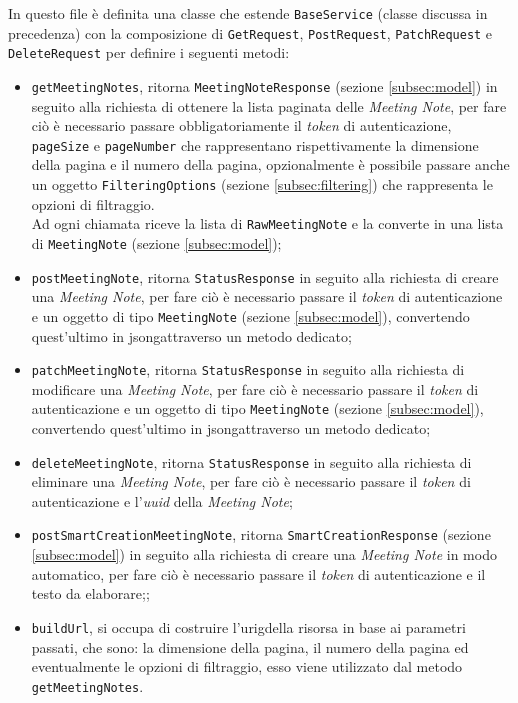 In questo file è definita una classe che estende \lstinline{BaseService} (classe discussa in precedenza) con la composizione di \lstinline{GetRequest}, \lstinline{PostRequest}, \lstinline{PatchRequest} e \lstinline{DeleteRequest} per definire i seguenti metodi:
\begin{itemize}
    \item \lstinline{getMeetingNotes}, ritorna \lstinline{MeetingNoteResponse} (sezione \ref{subsec:model}) in seguito alla richiesta di ottenere la lista paginata delle \emph{Meeting Note}, per fare ciò è necessario passare obbligatoriamente il \emph{token} di autenticazione, \lstinline{pageSize} e \lstinline{pageNumber} che rappresentano rispettivamente la dimensione della pagina e il numero della pagina, opzionalmente è possibile passare anche un oggetto \lstinline{FilteringOptions} (sezione \ref{subsec:filtering}) che rappresenta le opzioni di filtraggio. \\
    Ad ogni chiamata riceve la lista di \lstinline{RawMeetingNote} e la converte in una lista di \lstinline{MeetingNote} (sezione \ref{subsec:model});
    \item \lstinline{postMeetingNote}, ritorna \lstinline{StatusResponse} in seguito alla richiesta di creare una \emph{Meeting Note}, per fare ciò è necessario passare il \emph{token} di autenticazione e un oggetto di tipo \lstinline{MeetingNote} (sezione \ref{subsec:model}), convertendo quest'ultimo in \gls{jsong}\glsoccur attraverso un metodo dedicato;
    \item \lstinline{patchMeetingNote}, ritorna \lstinline{StatusResponse} in seguito alla richiesta di modificare una \emph{Meeting Note}, per fare ciò è necessario passare il \emph{token} di autenticazione e un oggetto di tipo \lstinline{MeetingNote} (sezione \ref{subsec:model}), convertendo quest'ultimo in \gls{jsong}\glsoccur attraverso un metodo dedicato;
    \item \lstinline{deleteMeetingNote}, ritorna \lstinline{StatusResponse} in seguito alla richiesta di eliminare una \emph{Meeting Note}, per fare ciò è necessario passare il \emph{token} di autenticazione e l'\emph{uuid} della \emph{Meeting Note};
    \item \lstinline{postSmartCreationMeetingNote}, ritorna \lstinline{SmartCreationResponse} (sezione \ref{subsec:model}) in seguito alla richiesta di creare una \emph{Meeting Note} in modo automatico, per fare ciò è necessario passare il \emph{token} di autenticazione e il testo da elaborare;;
    \item \lstinline{buildUrl}, si occupa di costruire l'\gls{urig}\glsoccur della risorsa in base ai parametri passati, che sono: la dimensione della pagina, il numero della pagina ed eventualmente le opzioni di filtraggio, esso viene utilizzato dal metodo \lstinline{getMeetingNotes}.
\end{itemize}

